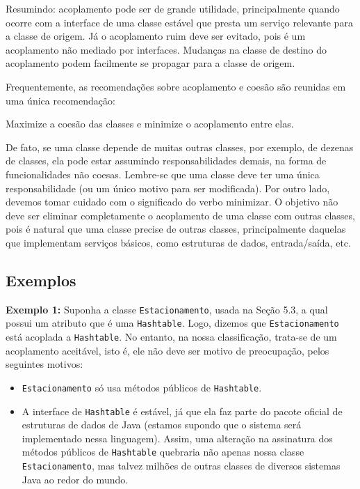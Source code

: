 \documentclass[
  11pt,
  twoside]{book}
\newcommand{\passthrough}[1]{#1}
\renewenvironment{quote}{\centering \vspace{1.5ex} \begin{tcolorbox}[colback=backcolor, width=4.9in]}{\end{tcolorbox}}
\begin{document}
Resumindo: acoplamento pode ser de grande utilidade, principalmente
quando ocorre com a interface de uma classe estável que presta um
serviço relevante para a classe de origem. Já o acoplamento ruim deve
ser evitado, pois é um acoplamento não mediado por interfaces. Mudanças
na classe de destino do acoplamento podem facilmente se propagar para a
classe de origem.

Frequentemente, as recomendações sobre acoplamento e coesão são reunidas
em uma única recomendação:

\begin{quote}
Maximize a coesão das classes e minimize o acoplamento entre elas.
\end{quote}

De fato, se uma classe depende de muitas outras classes, por exemplo, de
dezenas de classes, ela pode estar assumindo responsabilidades demais,
na forma de funcionalidades não coesas. Lembre-se que uma classe deve
ter uma única responsabilidade (ou um único motivo para ser modificada).
Por outro lado, devemos tomar cuidado com o significado do verbo
minimizar. O objetivo não deve ser eliminar completamente o acoplamento
de uma classe com outras classes, pois é natural que uma classe precise
de outras classes, principalmente daquelas que implementam serviços
básicos, como estruturas de dados, entrada/saída, etc.

\hypertarget{exemplos-1}{%
\subsection{Exemplos}\label{exemplos-1}}

\textbf{Exemplo 1:} Suponha a classe
\passthrough{\lstinline!Estacionamento!}, usada na Seção 5.3, a qual
possui um atributo que é uma \passthrough{\lstinline!Hashtable!}. Logo,
dizemos que \passthrough{\lstinline!Estacionamento!} está acoplada a
\passthrough{\lstinline!Hashtable!}. No entanto, na nossa classificação,
trata-se de um acoplamento aceitável, isto é, ele não deve ser motivo de
preocupação, pelos seguintes motivos:

\begin{itemize}
\item
  \passthrough{\lstinline!Estacionamento!} só usa métodos públicos de
  \passthrough{\lstinline!Hashtable!}.
\item
  A interface de \passthrough{\lstinline!Hashtable!} é estável, já que
  ela faz parte do pacote oficial de estruturas de dados de Java
  (estamos supondo que o sistema será implementado nessa linguagem).
  Assim, uma alteração na assinatura dos métodos públicos de
  \passthrough{\lstinline!Hashtable!} quebraria não apenas nossa classe
  \passthrough{\lstinline!Estacionamento!}, mas talvez milhões de outras
  classes de diversos sistemas Java ao redor do mundo.
\end{itemize}
\end{document}
